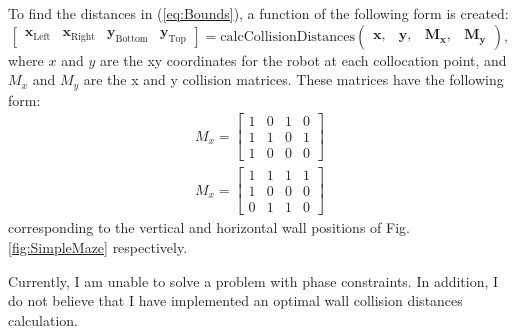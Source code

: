 \documentclass[12pt]{article}
\numberwithin{equation}{section} %
\numberwithin{figure}{section} %
\begin{document}
To find the distances in (\ref{eq:Bounds}), a function of the following form is created:
\begin{equation}
	\begin{bmatrix}
		\boldsymbol{x_\mathrm{Left}} & \boldsymbol{x_\mathrm{Right}} & \boldsymbol{y_\mathrm{Bottom}} & \boldsymbol{y_\mathrm{Top}}
	\end{bmatrix} = \mathrm{calcCollisionDistances} \left( \begin{matrix}
	\boldsymbol{x}, & \boldsymbol{y}, & \boldsymbol{M_x}, & \boldsymbol{M_y}
	\end{matrix}
	\right), \nonumber
\end{equation}
where $x$ and $y$ are the xy coordinates for the robot at each collocation point, and $M_x$ and $M_y$ are the x and y collision matrices. These matrices have the following form:
\begin{align}
	M_x = \begin{bmatrix}
		1 & 0 & 1 & 0 \\
		1 & 1 & 0 & 1 \\
		1 & 0 & 0 & 0
	\end{bmatrix} \nonumber \\
	M_x = \begin{bmatrix}
		1 & 1 & 1 & 1 \\
		1 & 0 & 0 & 0 \\
		0 & 1 & 1 & 0
		\end{bmatrix} \nonumber
\end{align}
corresponding to the vertical and horizontal wall positions of Fig. \ref{fig:SimpleMaze} respectively.

Currently, I am unable to solve a problem with phase constraints. In addition, I do not believe that I have implemented an optimal wall collision distances calculation.

%
%
	
\end{document}
